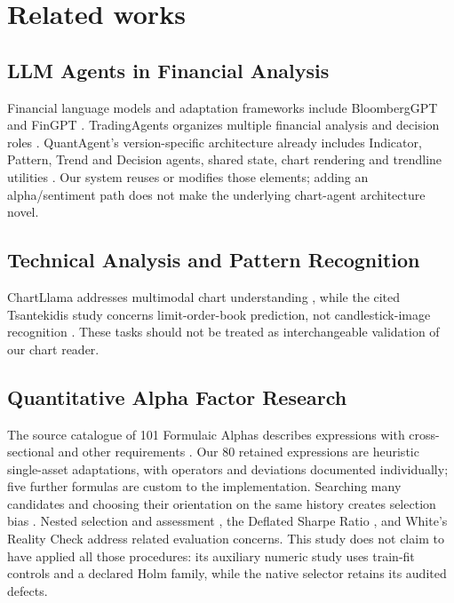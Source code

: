 \section{Related works}
\label{sec:relatedworks}

\subsection{LLM Agents in Financial Analysis}
Financial language models and adaptation frameworks include BloombergGPT and FinGPT \cite{wu2023bloomberggpt,yang2023fingpt}. TradingAgents organizes multiple financial analysis and decision roles \cite{tradingagents2024}. QuantAgent's version-specific architecture already includes Indicator, Pattern, Trend and Decision agents, shared state, chart rendering and trendline utilities \cite{xiong2025quantagent}. Our system reuses or modifies those elements; adding an alpha/sentiment path does not make the underlying chart-agent architecture novel. \subsection{Technical Analysis and Pattern Recognition}
ChartLlama addresses multimodal chart understanding \cite{han2023chartllama}, while the cited Tsantekidis study concerns limit-order-book prediction, not candlestick-image recognition \cite{tsantekidis2017lob}. These tasks should not be treated as interchangeable validation of our chart reader.

\subsection{Quantitative Alpha Factor Research}
The source catalogue of 101 Formulaic Alphas describes expressions with cross-sectional and other requirements \cite{kakushadze2016formulaic}. Our 80 retained expressions are heuristic single-asset adaptations, with operators and deviations documented individually; five further formulas are custom to the implementation. Searching many candidates and choosing their orientation on the same history creates selection bias \cite{harvey2016}. Nested selection and assessment \cite{varma2006bias}, the Deflated Sharpe Ratio \cite{bailey2014deflated}, and White's Reality Check \cite{white2000reality} address related evaluation concerns. This study does not claim to have applied all those procedures: its auxiliary numeric study uses train-fit controls and a declared Holm family, while the native selector retains its audited defects.

